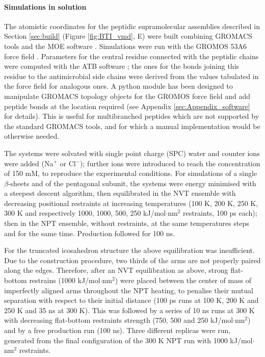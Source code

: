 \paragraph{Simulations in solution} The atomistic coordinates for the peptidic supramolecular assemblies described in Section \ref{sec:build} (Figure \ref{fig:BTI_vmd}, E) were built combining GROMACS tools and the MOE software \citep{moe}.
%
Simulations were run with the GROMOS 53A6 force field \citep{Oostenbrink2004}. Parameters for the central residue connected with the peptidic chains were computed with the ATB software \citep{Malde2011, Koziara2014}; the ones for the bonds joining this residue to the antimicrobial side chains were derived from the values tabulated in the force field for analogous ones.
%
A python module has been designed to manipulate GROMACS topology objects for the GROMOS force field and add peptide bonds at the location required (see Appendix \ref{sec:Appendix_software} for details). This is useful for multibranched peptides which are not supported by the standard GROMACS tools, and for which a manual implementation would be otherwise needed.

The systems were solvated with single point charge (SPC) water \citep{Berendsen1981} and counter ions were added (Na$^+$ or Cl$^-$); further ions were introduced to reach the concentration of 150 mM, to reproduce the experimental conditions.
%
For simulations of a single $\beta$-sheets and of the pentagonal subunit, the systems were energy minimised with a steepest descent algorithm, then equilibrated in the NVT ensemble with decreasing positional restraints at increasing temperatures (100 K, 200 K, 250 K, 300 K and respectively 1000, 1000, 500, 250 kJ/mol$\cdot$nm$^2$ restraints, 100 ps each); then in the NPT ensemble, without restraints, at the same temperatures steps and for the same time. Production followed for 100 ns.

For the truncated icosahedron structure the above equilibration was insufficient. Due to the construction procedure, two thirds of the arms are not properly paired along the edges.
%
Therefore, after an NVT equilibration as above, strong flat-bottom restrains (1000 kJ/mol$\cdot$nm$^2$) were placed between the center of mass of imperfectly aligned arms throughout the NPT heating, to penalise their mutual separation with respect to their initial distance (100 ps runs at 100 K, 200 K and 250 K and 35 ns at 300 K).
%
This was followed by a series of 10 ns runs at 300 K with decreasing flat-bottom restraints strength (750, 500 and 250 kJ/mol$\cdot$nm$^2$) and by a free production run (100 ns).
%
Three different replicas were run, generated from the final configuration of the 300 K NPT run with 1000 kJ/mol$\cdot$nm$^2$ restraints.

